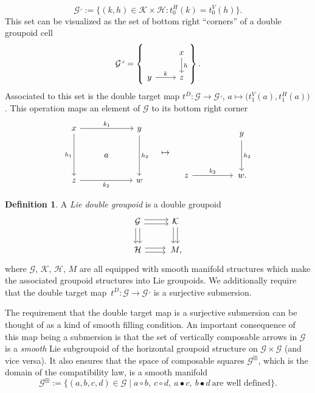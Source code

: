 \documentclass[10pt,a4paper]{amsart}
\numberwithin{equation}{section}
\theoremstyle{definition}
\newtheorem{Definition}[Theorem]{Definition}
\newcommand{\CG}{\mathcal{G}}
\newcommand{\CH}{\mathcal{H}}
\newcommand{\CK}{\mathcal{K}}
\newcommand{\darrow}{\arrow[d, shift right] \arrow[d, shift left]}
\newcommand{\rarrow}{\arrow[r, shift right] \arrow[r, shift left]}
\begin{document}
\[ \CG^\lrcorner := \big\{ (k,h) \in \CK \times \CH \colon t_0^H(k) = t_0^V(h) \big\}. \]
This set can be visualized as the set of bottom right ``corners'' of a double groupoid cell
\[
\CG^\lrcorner = \left \{ \begin{tikzcd}
 & x \arrow[d, "h"] \\
y \arrow[r, "k"] & z
\end{tikzcd} \right\}.
\]
Associated to this set is the double target map
$
t^D \colon \CG \to \CG^\lrcorner$, $a \mapsto \big(t_1^V(a), t_1^H(a)\big)$.
This operation maps an element of $ \CG $ to its bottom right corner
\[
\begin{tikzcd}
   x \arrow[rr, "k_1"] \arrow[dd, "h_1", swap] & & y \arrow[dd, "h_2"] \\
   & a & \\
   z\arrow[rr, "k_2", swap] & & w
\end{tikzcd} \quad
\mapsto \quad
\begin{tikzcd}
   & & y \arrow[dd, "h_2"]\\
   & & \\
   z \arrow[rr, "k_2"] & &\, w.
\end{tikzcd}
\]
\begin{Definition}\label{defn:lie.double.groupoid}
A \emph{Lie double groupoid} is a double groupoid
 \[\begin{tikzcd}
\CG \darrow \rarrow & \CK \darrow \\
\CH \rarrow &\, M,
\end{tikzcd}\]
where $ \CG$, $\CK$, $\CH$, $M $ are all equipped with smooth manifold structures which make the associated groupoid structures into Lie groupoids. We additionally require that the double target map~${t^D \colon \CG \to \CG^\lrcorner}$
is a surjective submersion.
\end{Definition}
The requirement that the double target map is a surjective submersion can be thought of as a kind of smooth filling condition.
An important consequence of this map being a submersion is that the set of vertically composable arrows in $ \CG $ is a \emph{smooth} Lie subgroupoid of the horizontal groupoid structure on $ \CG \times \CG $ (and vice versa). It also ensures that the space of composable squares $ \CG^\boxplus $, which is the domain of the compatibility law, is a smooth manifold
\begin{equation}\label{equation:groupoid.box}
\CG^\boxplus := \{ (a,b,c,d) \in \CG \mid a \circ b, \ c \circ d, \ a \bullet c, \ b \bullet d \ \text{are well defined} \}. \end{equation}
\end{document}
